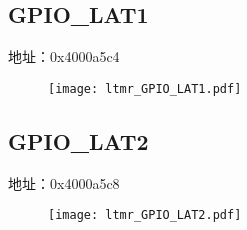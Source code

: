 \subsection{GPIO\_LAT1}
\label{ltmr-GPIO-LAT1}
地址：0x4000a5c4
 \begin{figure}[H]
\texttt{[image: ltmr\_GPIO\_LAT1.pdf]}
\end{figure}

\subsection{GPIO\_LAT2}
\label{ltmr-GPIO-LAT2}
地址：0x4000a5c8
 \begin{figure}[H]
\texttt{[image: ltmr\_GPIO\_LAT2.pdf]}
\end{figure}

